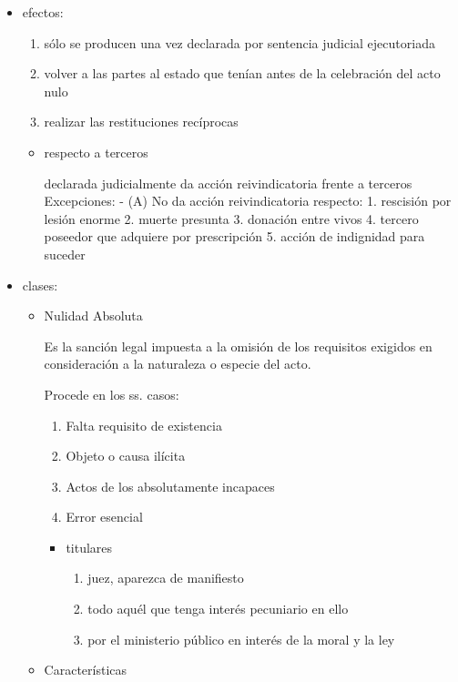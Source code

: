 \documentclass[]{article}
\begin{document}
\begin{itemize}
\item
  efectos:

  \begin{enumerate}
  \def\labelenumi{\arabic{enumi}.}
  \item
    sólo se producen una vez declarada por sentencia judicial
    ejecutoriada
  \item
    volver a las partes al estado que tenían antes de la celebración del
    acto nulo
  \item
    realizar las restituciones recíprocas
  \end{enumerate}

  \begin{itemize}
  \item
    respecto a terceros

    declarada judicialmente da acción reivindicatoria frente a terceros
    Excepciones: - (A) No da acción reivindicatoria respecto: 1.
    rescisión por lesión enorme 2. muerte presunta 3. donación entre
    vivos 4. tercero poseedor que adquiere por prescripción 5. acción de
    indignidad para suceder
  \end{itemize}
\item
  clases:

  \begin{itemize}
  \item
    Nulidad Absoluta

    Es la sanción legal impuesta a la omisión de los requisitos exigidos
    en consideración a la naturaleza o especie del acto.

    Procede en los ss. casos:

    \begin{enumerate}
    \def\labelenumi{\alph{enumi})}
    \item
      Falta requisito de existencia
    \item
      Objeto o causa ilícita
    \item
      Actos de los absolutamente incapaces
    \item
      Error esencial
    \end{enumerate}

    \begin{itemize}
    \item
      titulares

      \begin{enumerate}
      \def\labelenumi{\arabic{enumi}.}
      \item
        juez, aparezca de manifiesto
      \item
        todo aquél que tenga interés pecuniario en ello
      \item
        por el ministerio público en interés de la moral y la ley
      \end{enumerate}
    \end{itemize}
  \item
    Características


\end{itemize}
\end{itemize}
\end{document}
